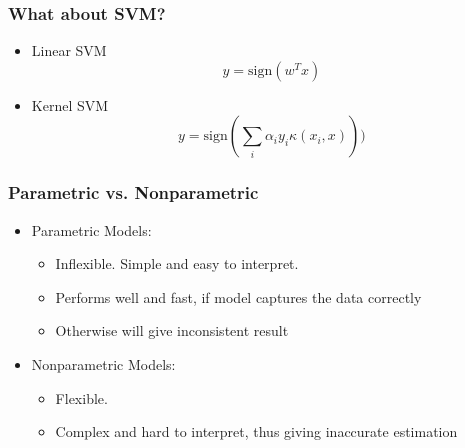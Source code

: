 \documentclass{beamer}
\begin{document}
\begin{frame}
	\frametitle{What about SVM?}
	\begin{itemize}
		\item {Linear SVM}
		\[
			y=\text{sign}(w^Tx)
		\]
		\pause
		\item {Kernel SVM}
		\[
			y=\text{sign}(\sum_i \alpha_i y_i\kappa(x_i, x)))
		\]
	\end{itemize}
\end{frame}
\begin{frame}
	\frametitle{Parametric vs. Nonparametric}
	\begin{itemize}
		\item Parametric Models:
		\begin{itemize}
			\item Inflexible. Simple and easy to interpret.
			\item Performs well and fast, if model captures the data correctly
			\item Otherwise will give inconsistent result
		\end{itemize}
		\item Nonparametric Models:
		\begin{itemize}
			\item Flexible.
			\item Complex and hard to interpret, thus giving inaccurate estimation
		\end{itemize}
	\end{itemize}
\end{frame}
\end{document}
